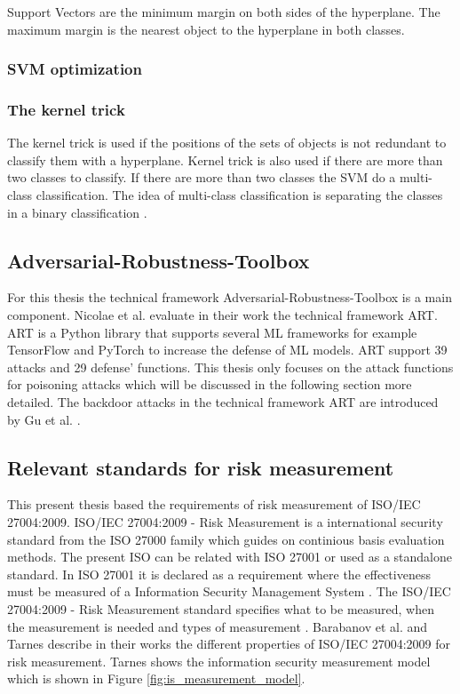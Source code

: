 Support Vectors are the minimum margin on both sides of the hyperplane. The maximum margin is the nearest object to the hyperplane in both classes.

\subsubsection*{SVM optimization}

\subsubsection*{The kernel trick}

The kernel trick is used if the positions of the sets of objects is not redundant to classify them with a hyperplane. Kernel trick is also used if there are more than two classes to classify. If there
are more than two classes the SVM do a multi-class classification. The idea of multi-class classification is separating the classes in a binary classification \cite{tzotsos2008support}.

\subsection{Adversarial-Robustness-Toolbox}

For this thesis the technical framework Adversarial-Robustness-Toolbox \cite{art2018} is a main component. Nicolae et al. \cite{DBLP:journals/corr/abs-1807-01069} evaluate in their work the
technical framework ART. ART is a Python library that supports several ML frameworks for example TensorFlow and PyTorch to increase the defense of ML models. ART support 39 attacks and 29 defense'
functions. This thesis only focuses on the attack functions for poisoning attacks which will be discussed in the following section more detailed. The backdoor attacks in the technical framework
ART are introduced by Gu et al. \cite{DBLP:journals/corr/abs-1708-06733}.

\subsection{Relevant standards for risk measurement}

This present thesis based the requirements of risk measurement of ISO/IEC 27004:2009. ISO/IEC 27004:2009 - Risk Measurement is a international security standard from the ISO 27000 \cite{DBLP:conf/euspn/MeriahR19} family which guides on continious basis evaluation methods. The present ISO can be related with ISO 27001 or used as a standalone standard. In ISO 27001 it is declared as a requirement where the effectiveness must be measured of a Information Security Management System \cite{barabanov2011information}. The ISO/IEC 27004:2009 - Risk Measurement standard specifies what to be measured, when the measurement is needed and types of measurement \cite{lundholm2011design}. Barabanov et al. \cite{barabanov2011information} and Tarnes \cite{tarnes2012information} describe in their works the different properties of ISO/IEC 27004:2009 for risk measurement. Tarnes shows the information security measurement model which is shown in Figure \ref{fig:is_measurement_model}.

